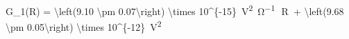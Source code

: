 G_1(R) = \SI[parse-numbers = false]{\left(9.10 \pm 0.07\right) \times 10^{-15}}{\volt^2\per\ohm}\, \cdot \,R\, + \SI[parse-numbers = false]{\left(9.68 \pm 0.05\right) \times 10^{-12}}{\volt^2}